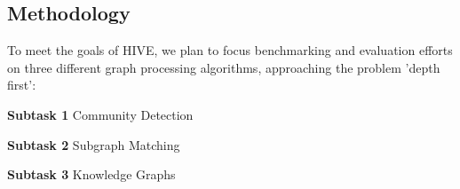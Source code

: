 \documentclass[letterpaper, 10pt]{article}
\begin{document}
\begin{multicols}{2}
{    \section{Methodology}\label{section:methodology}
    To meet the goals of HIVE, we plan to focus benchmarking and evaluation efforts on three different graph processing algorithms, approaching the problem 'depth first':
    \newline
    
        \textbf{Subtask 1} Community Detection
        
        \textbf{Subtask 2} Subgraph Matching
        
        \textbf{Subtask 3} Knowledge Graphs

}
\end{multicols}
\end{document}
